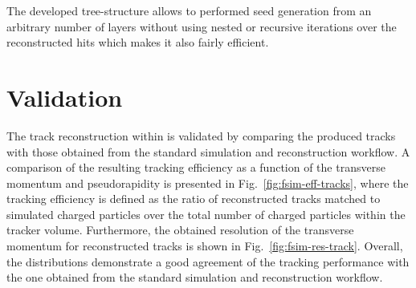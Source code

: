 The developed tree-structure allows to performed seed generation from an arbitrary number of layers without using nested or recursive iterations over the reconstructed hits which makes it also fairly efficient.

\section{Validation}
\label{sec:fsim-validation}

The track reconstruction within \FSIM is validated by comparing the produced tracks with those obtained from the standard simulation and reconstruction workflow. A comparison of the resulting tracking efficiency as a function of the transverse momentum and pseudorapidity is presented in Fig.~\ref{fig:fsim-eff-tracks}, where the tracking efficiency is defined as the ratio of reconstructed tracks matched to simulated charged particles over the total number of charged particles within the tracker volume. Furthermore, the obtained resolution of the transverse momentum for reconstructed tracks is shown in Fig.~\ref{fig:fsim-res-track}. Overall, the distributions demonstrate a good agreement of the \FSIM tracking performance with the one obtained from the standard simulation and reconstruction workflow.


